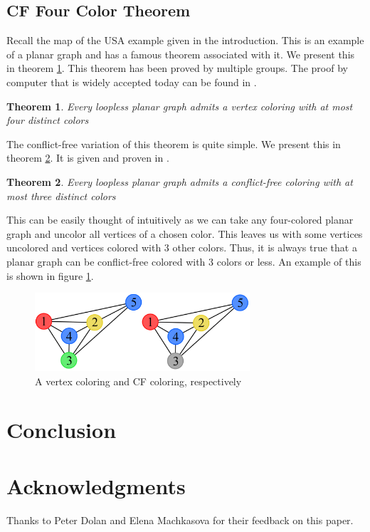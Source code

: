 \documentclass{sig-alternate}
\newtheorem{theorem}{Theorem}
\begin{document}
\subsection{CF Four Color Theorem}
Recall the map of the USA example given in the introduction. This is an example of a planar graph and has a famous theorem associated with it. We present this in theorem \ref{thm:four}. This theorem has been proved by multiple groups. The proof by computer that is widely accepted today can be found in \cite{robertson1997four}.

\begin{theorem} \label{thm:four}
Every loopless planar graph admits a vertex coloring with at most four distinct colors
\end{theorem}

The conflict-free variation of this theorem is quite simple. We present this in theorem \ref{thm:four-cf}. It is given and proven in \cite{abel2017three}.

\begin{theorem} \label{thm:four-cf}
Every loopless planar graph admits a conflict-free coloring with at most three distinct colors
\end{theorem}

This can be easily thought of intuitively as we can take any four-colored planar graph and uncolor all vertices of a chosen color. This leaves us with some vertices uncolored and vertices colored with 3 other colors. Thus, it is always true that a planar graph can be conflict-free colored with 3 colors or less. An example of this is shown in figure \ref{fig:four}.

\begin{figure}[h]
	\centering
	\includegraphics[width=8cm,trim=4 4 4 4,clip]{../figures/four.pdf}
	\caption{A vertex coloring and CF coloring, respectively}\label{fig:four}
\end{figure}


\section{Conclusion}
\label{sec:conclusion}

\section{Acknowledgments}
Thanks to Peter Dolan and Elena Machkasova for their feedback on this paper.



\end{document}
